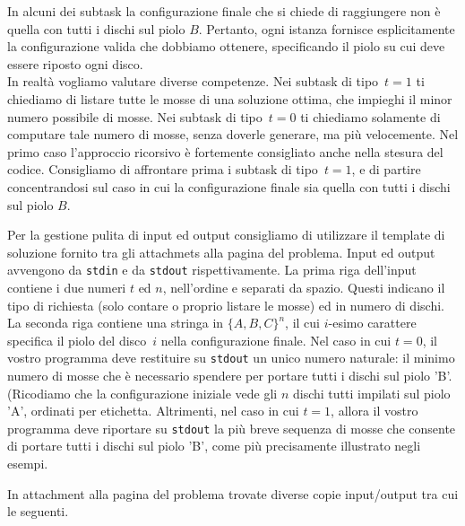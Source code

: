 In alcuni dei subtask la configurazione finale che si chiede di raggiungere non è quella con tutti i dischi sul piolo $B$. Pertanto, ogni istanza fornisce esplicitamente la configurazione valida che dobbiamo ottenere, specificando il piolo su cui deve essere riposto ogni disco.\\ 

In realtà vogliamo valutare diverse competenze. Nei subtask di tipo~$t=1$ ti chiediamo di listare tutte le mosse di una soluzione ottima, che impieghi il minor numero possibile di mosse.
Nei subtask di tipo~$t=0$ ti chiediamo solamente di computare tale numero di mosse, senza doverle generare, ma più velocemente.
Nel primo caso l'approccio ricorsivo è fortemente consigliato anche nella stesura del codice.
Consigliamo di affrontare prima i subtask di tipo~$t=1$,
e di partire concentrandosi sul caso in cui la configurazione finale sia quella con tutti i dischi sul piolo $B$.



Per la gestione pulita di input ed output consigliamo di utilizzare il template di soluzione fornito tra gli attachmets alla pagina del problema.
Input ed output avvengono da \verb'stdin'
e da \verb'stdout' rispettivamente.
La prima riga dell'input contiene i due numeri $t$ ed $n$, nell'ordine e separati da spazio. Questi indicano il tipo di richiesta (solo contare o proprio listare le mosse) ed in numero di dischi.
La seconda riga contiene una stringa in $\{A,B,C\}^n$, il cui $i$-esimo carattere specifica il piolo del disco~$i$ nella configurazione finale.
Nel caso in cui $t=0$, il vostro programma deve restituire su \verb'stdout' un unico numero naturale: il minimo numero di mosse che è necessario spendere per portare tutti i dischi sul piolo 'B'.
(Ricodiamo che la configurazione iniziale vede gli $n$ dischi tutti impilati sul piolo 'A', ordinati per etichetta.
Altrimenti, nel caso in cui $t= 1$,
allora il vostro programma deve riportare su \verb'stdout'
la più breve sequenza di mosse che consente di portare tutti i dischi sul piolo 'B', come più precisamente illustrato negli esempi. 



In attachment alla pagina del problema trovate diverse copie input/output tra cui le seguenti.


\vspace{0.5cm}

